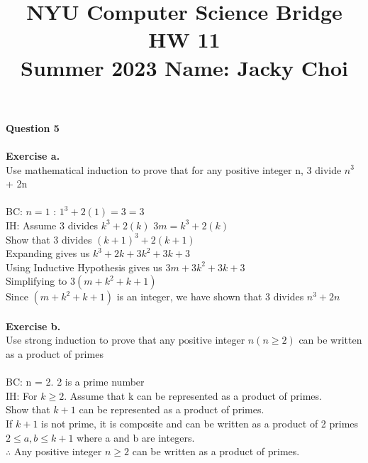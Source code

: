 \documentclass{article}
\title{\textbf{NYU Computer Science Bridge HW 11}\\
Summer 2023 Name: Jacky Choi}
\date{}
\begin{document}
\setul{}{2pt}
\maketitle

\noindent \textbf{Question 5}\\\\
\textbf{Exercise  a.}\\
Use mathematical induction to prove that for any positive integer n, 3 divide $n^3$ + 2n\\\\
BC: $n = 1$ : $1^3 + 2(1) = 3 = 3$\\
IH: Assume 3 divides $k^3 + 2(k)$ $3m = k^3 + 2(k)$\\
Show that 3 divides $(k+1)^3 + 2(k+1)$\\
Expanding gives us $k^3 + 2k + 3k^2 + 3k + 3$\\
Using Inductive Hypothesis gives us $3m + 3k^2 + 3k + 3$\\
Simplifying to $3(m + k^2 + k + 1)$\\
Since $(m + k^2 + k + 1)$ is an integer, we have shown that 3 divides $n^3+ 2n$\\\\
\textbf{Exercise  b.}\\
Use strong induction to prove that any positive integer $n (n\geq 2)$ can be written as a
product of primes\\\\
BC: n = 2. 2 is a prime number\\
IH: For $k \geq 2$. Assume that k can be represented as a product of primes.\\
Show that $k+1$ can be represented as a product of primes.\\
If $k+1$ is not prime, it is composite and can be written as a product of 2 primes\\
$2 \leq a,b \leq k+1$ where a and b are integers.\\
$\therefore$ Any positive integer $n \geq 2$ can be written as a product of primes.\\
\newpage
\end{document}
